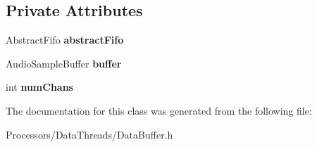 \subsection*{Private Attributes}
\begin{DoxyCompactItemize}
\item 
\hypertarget{classDataBuffer_a5961ca39f034fa05de297d35b6bb58ce}{Abstract\-Fifo {\bfseries abstract\-Fifo}}\label{classDataBuffer_a5961ca39f034fa05de297d35b6bb58ce}

\item 
\hypertarget{classDataBuffer_a8d1728e754f571361f9dca6d30f610ca}{Audio\-Sample\-Buffer {\bfseries buffer}}\label{classDataBuffer_a8d1728e754f571361f9dca6d30f610ca}

\item 
\hypertarget{classDataBuffer_aa58c07ffde819061664ca94562604f14}{int {\bfseries num\-Chans}}\label{classDataBuffer_aa58c07ffde819061664ca94562604f14}

\end{DoxyCompactItemize}


The documentation for this class was generated from the following file\-:\begin{DoxyCompactItemize}
\item 
Processors/\-Data\-Threads/Data\-Buffer.\-h\end{DoxyCompactItemize}
